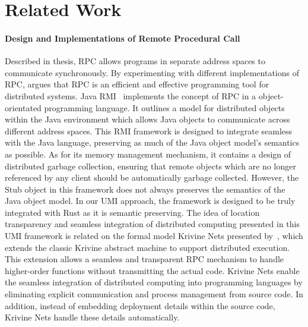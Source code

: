 \section{Related Work}
\label{chap3:related-work}
\paragraph*{Design and Implementations of Remote Procedural Call}
Described in  thesis, RPC allows programs in separate address spaces to communicate synchronously. By experimenting with different implementations of RPC, \citet{10.5555/910306} argues that RPC is an efficient and effective programming tool for distributed systems. Java RMI~\citep{10.5555/1268049.1268066} implements the concept of RPC in a object-orientated programming language. It outlines a model for distributed objects within the Java environment which allows Java objects to communicate across different address spaces. This RMI framework is designed to integrate seamless with the Java language, preserving as much of the Java object model's semantics as possible. As for its memory management mechanism, it contains a design of distributed garbage collection, ensuring that remote objects which are no longer referenced by any client should be automatically garbage collected. However, the Stub object in this framework does not always preserves the semantics of the Java object model. In our UMI approach, the framework is designed to be truly integrated with Rust as it is semantic preserving. The idea of location transparency and seamless integration of distributed computing presented in this UMI framework is related on the formal model Krivine Nets presented by~\citet{10.1145/2628136.2628152}, which extends the classic Krivine abstract machine to support distributed execution. This extension allows a seamless and transparent RPC mechanism to handle higher-order functions without transmitting the actual code. Krivine Nets enable the seamless integration of distributed computing into programming languages by eliminating explicit communication and process management from source code. In addition, instead of embedding deployment details within the source code, Krivine Nets handle these details automatically.

